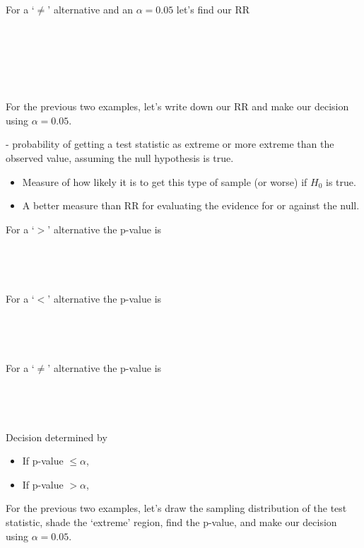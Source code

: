 For a `$\neq$' alternative and an $\alpha=0.05$ let's find our RR\\~\\~\\~\\~\\~\\~\\

For the previous two examples, let's write down our RR and make our decision using $\alpha=0.05$.

\newpage

\underbar{~~~~~~~~~~~~~~~~~~~~~~~~~~~~~~~~~~~~~~~~~} - probability of getting a test statistic as extreme or more extreme than the observed value, assuming the null hypothesis is true.
\begin{itemize}
\item Measure of how likely it is to get this type of sample (or worse) if $H_0$ is true.
\item A better measure than RR for evaluating the evidence for or against the null. 
\end{itemize}
For a `$>$' alternative the p-value is\\~\\~\\~\\~\\
For a `$<$' alternative the p-value is\\~\\~\\~\\~\\
For a `$\neq$' alternative the p-value is\\~\\~\\~\\~\\
Decision determined by
\begin{itemize}
\item If p-value $\leq\alpha$, \underbar{~~~~~~~~~~~~~~~~~~~~~~~~~~~~~~~~~~~~~~~~~~~~~~~~~~~~~~~~~~~~~~~~~~}\\
\item If p-value $>\alpha$, \underbar{~~~~~~~~~~~~~~~~~~~~~~~~~~~~~~~~~~~~~~~~~~~~~~~~~~~~~~~~~~~~~~~~~~~~~}
\end{itemize}

For the previous two examples, let's draw the sampling distribution of the test statistic, shade the `extreme' region, find the p-value, and make our decision using $\alpha=0.05$.

